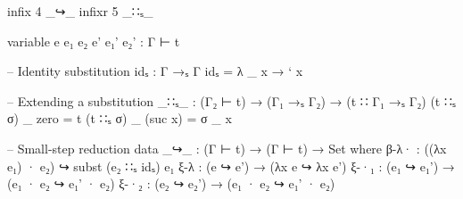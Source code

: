 \begin{code}[hide]
  infix 4 _↪_
  infixr 5 _∷ₛ_

  variable e e₁ e₂ e' e₁' e₂' : Γ ⊢ t

  -- Identity substitution
  idₛ : Γ →ₛ Γ
  idₛ = λ _ x → ` x

  -- Extending a substitution
  _∷ₛ_ : (Γ₂ ⊢ t) → (Γ₁ →ₛ Γ₂) → (t ∷ Γ₁ →ₛ Γ₂)
  (t ∷ₛ σ) _ zero     = t
  (t ∷ₛ σ) _ (suc x)  = σ _ x

  -- Small-step reduction
  data _↪_ : (Γ ⊢ t) → (Γ ⊢ t) → Set where
    β-λ·  : ((λx e₁) · e₂) ↪ subst (e₂ ∷ₛ idₛ) e₁
    ξ-λ   : (e ↪ e') → (λx e ↪ λx e')
    ξ-·₁  : (e₁ ↪ e₁') → (e₁ · e₂ ↪ e₁' · e₂)
    ξ-·₂  : (e₂ ↪ e₂') → (e₁ · e₂ ↪ e₁' · e₂)
\end{code}
